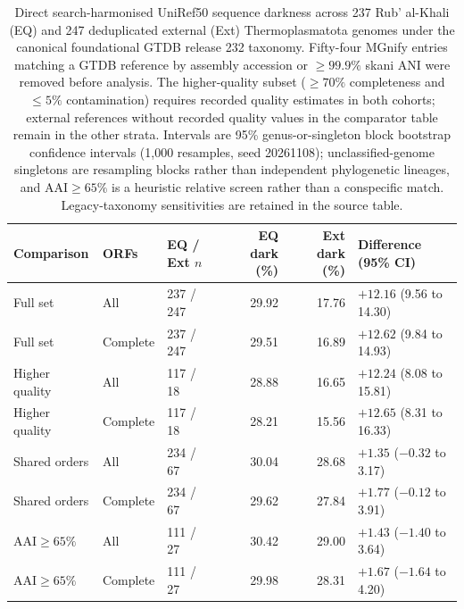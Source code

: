 \begin{table}[ht]\centering\footnotesize
\caption{Direct search-harmonised UniRef50 sequence darkness across 237 Rub' al-Khali (EQ) and 247 deduplicated external (Ext) Thermoplasmatota genomes under the canonical foundational GTDB release 232 taxonomy. Fifty-four MGnify entries matching a GTDB reference by assembly accession or $\geq 99.9\%$ skani ANI were removed before analysis. The higher-quality subset ($\geq 70\%$ completeness and $\leq 5\%$ contamination) requires recorded quality estimates in both cohorts; external references without recorded quality values in the comparator table remain in the other strata. Intervals are 95\% genus-or-singleton block bootstrap confidence intervals (1,000 resamples, seed 20261108); unclassified-genome singletons are resampling blocks rather than independent phylogenetic lineages, and $\mathrm{AAI}\geq 65\%$ is a heuristic relative screen rather than a conspecific match. Legacy-taxonomy sensitivities are retained in the source table.}\label{tab:ext_uniref50_completed}
\begin{tabular}{@{}p{}llrrl@{}}
\toprule
Comparison & ORFs & EQ / Ext $n$ & EQ dark (\%) & Ext dark (\%) & Difference (95\% CI)\\
\midrule
Full set & All & 237 / 247 & 29.92 & 17.76 & $+12.16$ (9.56 to 14.30)\\
Full set & Complete & 237 / 247 & 29.51 & 16.89 & $+12.62$ (9.84 to 14.93)\\
Higher quality & All & 117 / 18 & 28.88 & 16.65 & $+12.24$ (8.08 to 15.81)\\
Higher quality & Complete & 117 / 18 & 28.21 & 15.56 & $+12.65$ (8.31 to 16.33)\\
Shared orders & All & 234 / 67 & 30.04 & 28.68 & $+1.35$ ($-0.32$ to 3.17)\\
Shared orders & Complete & 234 / 67 & 29.62 & 27.84 & $+1.77$ ($-0.12$ to 3.91)\\
$\mathrm{AAI}\geq 65\%$ & All & 111 / 27 & 30.42 & 29.00 & $+1.43$ ($-1.40$ to 3.64)\\
$\mathrm{AAI}\geq 65\%$ & Complete & 111 / 27 & 29.98 & 28.31 & $+1.67$ ($-1.64$ to 4.20)\\
\bottomrule
\end{tabular}
\end{table}

